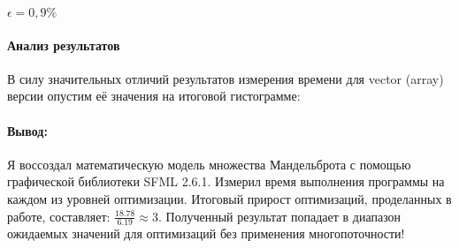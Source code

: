 \documentclass[12pt, letterpaper]{article}
\begin{document}
    $\epsilon = 0,9\%$\\

    \paragraph{Анализ результатов}

    В силу значительных отличий результатов измерения времени для vector (array) версии опустим её значения на итоговой гистограмме: 
    
    \begin{center}
    \end{center}

    \paragraph{Вывод:}
    Я воссоздал математическую модель множества Мандельброта с помощью графической библиотеки SFML 2.6.1. Измерил время выполнения программы на каждом из уровней оптимизации. Итоговый прирост оптимизаций, проделанных в работе, составляет: $\frac{18.78}{6.19} \approx 3$. Полученный результат попадает в диапазон ожидаемых значений для оптимизаций без применения многопоточности!
    
\end{document}
